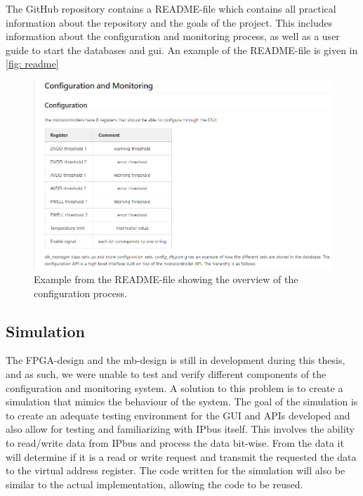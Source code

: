 \documentclass[main.tex]{subfiles}
\begin{document}
The GitHub repository contains a README-file which contains all practical information about the repository and the goals of the project. This includes information about the configuration and monitoring process, as well as a user guide to start the databases and \gls{gui}. An example of the README-file is given in \autoref{fig: readme}


\begin{figure}[!ht]
    \centering
    \includegraphics[width=18cm]{images/README_example.png}
    \caption{Example from the README-file showing the overview of the configuration process.}
    \label{fig: readme}
\end{figure}
\FloatBarrier

\subsection{Simulation}

The FPGA-design and the \gls{mb}-design is still in development during this thesis, and as such, we were unable to test and verify different components of the configuration and monitoring system. A solution to this problem is to create a simulation that mimics the behaviour of the system. The goal of the simulation is to create an adequate testing environment for the GUI and APIs developed and also allow for testing and familiarizing with IPbus itself. This involves the ability to read/write data from IPbus and process the data bit-wise. From the data it will determine if it is a read or write request and transmit the requested the data to the virtual address register. The code written for the simulation will also be similar to the actual implementation, allowing the code to be reused.
\end{document}
